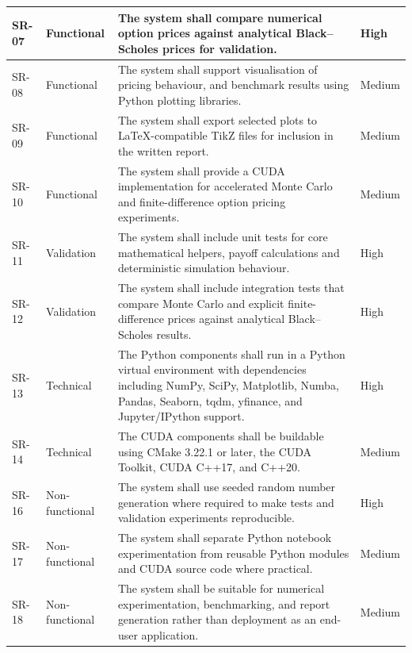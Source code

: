 \documentclass[11pt]{report}
\begin{document}
{\begin{longtable}{|L{0.11\textwidth}|L{0.18\textwidth}|L{0.45\textwidth}|L{0.11\textwidth}|}
  \hline
  SR-07 & Functional & The system shall compare numerical option prices against analytical Black--Scholes prices for validation. & High \\
  \hline
  SR-08 & Functional & The system shall support visualisation of pricing behaviour, and benchmark results using Python plotting libraries. & Medium
  \\
  \hline
  SR-09 & Functional & The system shall export selected plots to \LaTeX-compatible TikZ files for inclusion in the written report. & Medium \\
  \hline
  SR-10 & Functional & The system shall provide a CUDA implementation for accelerated Monte Carlo and finite-difference option pricing experiments. & Medium \\
  \hline
  SR-11 & Validation & The system shall include unit tests for core mathematical helpers, payoff calculations and deterministic simulation
  behaviour. & High \\
  \hline
  SR-12 & Validation & The system shall include integration tests that compare Monte Carlo and explicit finite-difference prices against analytical Black--Scholes results. &
  High \\
  \hline
  SR-13 & Technical & The Python components shall run in a Python virtual environment with dependencies including NumPy, SciPy, Matplotlib, Numba, Pandas, Seaborn, tqdm,
  yfinance, and Jupyter/IPython support. & High \\
  \hline
  SR-14 & Technical & The CUDA components shall be buildable using CMake 3.22.1 or later, the CUDA Toolkit, CUDA C++17, and C++20. & Medium \\
  \hline
  SR-16 & Non-functional & The system shall use seeded random number generation where required to make tests and validation experiments reproducible. & High \\
  \hline
  SR-17 & Non-functional & The system shall separate Python notebook experimentation from reusable Python modules and CUDA source code where practical. & Medium \\
  \hline
  SR-18 & Non-functional & The system shall be suitable for numerical experimentation, benchmarking, and report generation rather than deployment as an end-user application.
  & Medium \\
  \hline
\end{longtable}
}
\end{document}
